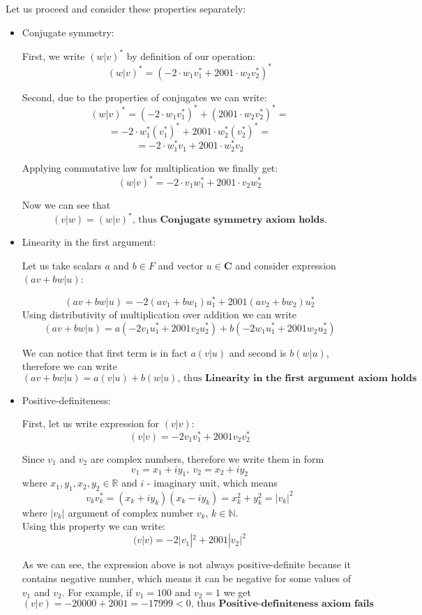 \documentclass{article}
\begin{document}
Let us proceed and consider these properties separately:
\begin{itemize}
    \item Conjugate symmetry:
    
    First, we write $(w|v)^*$ by definition of our operation:
    $$(w|v)^*=(-2\cdot w_1v_1^*+2001\cdot w_2v_2^*)^*$$
    
    Second, due to the properties of conjugates we can write:
    $$(w|v)^*=(-2\cdot w_1v_1^*)^*+(2001\cdot w_2v_2^*)^*=$$
    $$=-2\cdot w_1^*(v_1^*)^*+2001\cdot w_2^*(v_2^*)^*=$$
    $$=-2\cdot w_1^*v_1+2001\cdot w_2^*v_2$$
    
    Applying commutative law for multiplication we finally get:
    $$(w|v)^*=-2\cdot v_1w_1^*+2001\cdot v_2w_2^*$$
    
    Now we can see that 
    $$(v|w) = (w|v)^* \text{, thus }\textbf{Conjugate symmetry axiom holds.}$$
    
    \item Linearity in the first argument:
    
    Let us take scalars $a$ and $b\in F$ and vector $u\in \pmb{C}$ and consider expression $(av+bw|u)$:
    
    $$(av+bw|u) = -2(av_1+bw_1)u_1^*+2001(av_2+bw_2)u_2^*$$
    \newpage
    Using distributivity of multiplication over addition we can write
    $$(av+bw|u) = a(-2v_1u_1^*+2001v_2u_2^*)+b(-2w_1u_1^*+2001w_2u_2^*)$$
    
    We can notice that first term is in fact $a(v|u)$ and second is $b(w|u)$, therefore we can write
    $$(av+bw|u) = a(v|u)+b(w|u) \text{, thus }\textbf{Linearity in the first argument axiom holds}$$
    
    \item Positive-definiteness: 
    
    First, let us write expression for $(v|v)$:
    $$(v|v) = -2v_1v_1^*+2001v_2v_2^*$$
    
    Since $v_1$ and $v_2$ are complex numbers, therefore we write them in form
    $$v_1=x_1+iy_1,\ v_2=x_2+iy_2$$
    where $x_1,y_1,x_2,y_2\in \mathbb{R}$ and $i$ - imaginary unit, which means 
    $$v_kv_k^*=(x_k+iy_k)(x_k-iy_k)=x_k^2+y_k^2=|v_k|^2$$
    where $|v_k|$ argument of complex number $v_k$, $k\in \mathbb{N}$.\\
    
    Using this property we can write:
    $$(v|v) = -2|v_1|^2+2001|v_2|^2$$

    As we can see, the expression above is not always positive-definite because it contains negative number, which means it can be negative for some values of $v_1$ and $v_2$. For example, if $v_1=100$ and $v_2=1$ we get $$(v|v)=-20000+2001=-17999 < 0 \text{, thus }\textbf{Positive-definiteness axiom fails}$$ 
\end{itemize}
\end{document}
